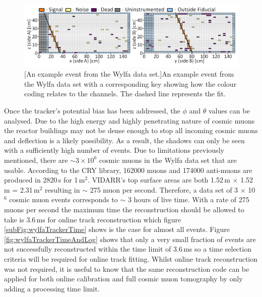 \begin{figure}[!h]
 \centering
 \includegraphics[width=\linewidth]{Chapter6/Figs/Raster/newExampleEventWylfaMedText.png}
 [An example event from the Wylfa data set.]{An example event from the Wylfa data set with a corresponding key showing how the colour coding relates to the channels. The dashed line represents the fit.} 
 \label{fig:3000ExampleEventWithKey}
\end{figure}

Once the tracker's potential bias has been addressed, the $\phi$ and $\theta$ values can be analysed. Due to the high energy and highly penetrating nature of cosmic muons \cite{Olive_2014} the reactor buildings may not be dense enough to stop all incoming cosmic muons and deflection is a likely possibility. As a result, the shadows can only be seen with a sufficiently high number of events. Due to limitations previously mentioned, there are $\sim 3 \times 10^6$ cosmic muons in the Wylfa data set that are usable. According to the CRY library, \cite{ieee_cry_2007} 162000 muons and 174000 anti-muons are produced in 2820\,s for 1\,m$^2$. VIDARR's top surface areas are both 1.52\,m $\times$ 1.52\,m = 2.31\,m$^2$ resulting in $\sim$ 275 muon per second. Therefore, a data set of 3 $\times$ 10$^6$ cosmic muon events corresponds to $\sim$ 3 hours of live time. With a rate of 275 muons per second the maximum time the reconstruction should be allowed to take is 3.6\,ms for online track reconstruction which figure \ref{subFig:wylfaTrackerTime} shows is the case for almost all events. Figure \ref{fig:wylfaTrackerTimeAndLog} shows that only a very small fraction of events are not successfully reconstructed within the time limit of 3.6\,ms so a time selection criteria will be required for online track fitting. Whilst online track reconstruction was not required, it is useful to know that the same reconstruction code can be applied for both online calibration and full cosmic muon tomography by only adding a processing time limit. 

